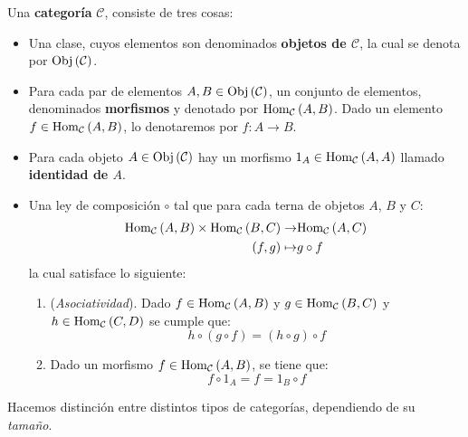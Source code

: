 \documentclass{article}
\newcounter{it}
\theoremstyle{largebreak}
\newcommand\cf[3]{\ensuremath{#1:#2\rightarrow#3}}
\newcommand{\Obj}[1]{\ensuremath{\textup{Obj}\left(#1\right)}}
\newcommand{\Hom}[3]{\ensuremath{\textup{Hom}_{#1}\left(#2,#3\right)}}
\begin{document}
    \begin{mydef}
        Una \textbf{categoría} $\mathcal{C}$, consiste de tres cosas:
        \begin{itemize}
            \item Una clase, cuyos elementos son denominados \textbf{objetos de $\mathcal{C}$}, la cual se denota por $\Obj{\mathcal{C}}$.
            \item Para cada par de elementos $A,B\in\Obj{\mathcal{C}}$, un conjunto de elementos, denominados \textbf{morfismos} y denotado por $\Hom{\mathcal{C}}{A}{B}$. Dado un elemento $f\in\Hom{\mathcal{C}}{A}{B}$, lo denotaremos por $\cf{f}{A}{B}$.
            \item Para cada objeto $A\in\Obj{\mathcal{C}}$ hay un morfismo $1_A\in\Hom{\mathcal{C}}{A}{A}$ llamado \textbf{identidad de $A$}.
            \item Una ley de composición $\circ$ tal que para cada terna de objetos $A$, $B$ y $C$:
            \begin{equation*}
                \begin{split}
                    \Hom{\mathcal{C}}{A}{B}\times\Hom{\mathcal{C}}{B}{C}\rightarrow&\Hom{\mathcal{C}}{A}{C}\\
                    (f,g)\mapsto&g\circ f\\
                \end{split}
            \end{equation*}
            la cual satisface lo siguiente:
            \begin{enumerate}
                \item (\textit{Asociatividad}). Dado $f\in\Hom{\mathcal{C}}{A}{B}$ y $g\in\Hom{\mathcal{C}}{B}{C}$ y $h\in\Hom{\mathcal{C}}{C}{D}$ se cumple que:
                \begin{equation*}
                    h\circ (g\circ f)=(h\circ g)\circ f
                \end{equation*}
                \item Dado un morfismo $f\in\Hom{\mathcal{C}}{A}{B}$, se tiene que:
                \begin{equation*}
                    f\circ 1_A=f=1_B\circ f
                \end{equation*}
            \end{enumerate}
        \end{itemize}
    \end{mydef}

    Hacemos distinción entre distintos tipos de categorías, dependiendo de su \textit{tamaño}.
\end{document}
